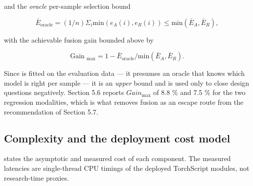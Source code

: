 and the \emph{oracle} per-sample selection bound

\begin{equation}
\label{eq:163}
\bar{E}_{\mathrm{oracle}} = (1/n) \Sigma _i \mathrm{min}( e_A(i), e_R(i) ) \leq \mathrm{min}( \bar{E}_A, \bar{E}_R ) ,
\end{equation}

with the achievable fusion gain bounded above by

\begin{equation}
\label{eq:164}
\text{Gain}\;_{\mathrm{max}} = 1 - \bar{E}_{\mathrm{oracle}} / \mathrm{min}( \bar{E}_A, \bar{E}_R ) .
\end{equation}

Since  is fitted on the evaluation data --- it presumes an oracle that knows which model is right per sample --- it is an \emph{upper} bound and is used only to close design questions negatively. Section 5.6 reports $Gain_{\mathrm{max}}$ of 8.8 \% and 7.5 \% for the two regression modalities, which is what removes fusion as an escape route from the recommendation of Section 5.7.

\FloatBarrier

\subsection{Complexity and the deployment cost model}

 states the asymptotic and measured cost of each component. The measured latencies are single-thread CPU timings of the deployed TorchScript modules, not research-time proxies.

